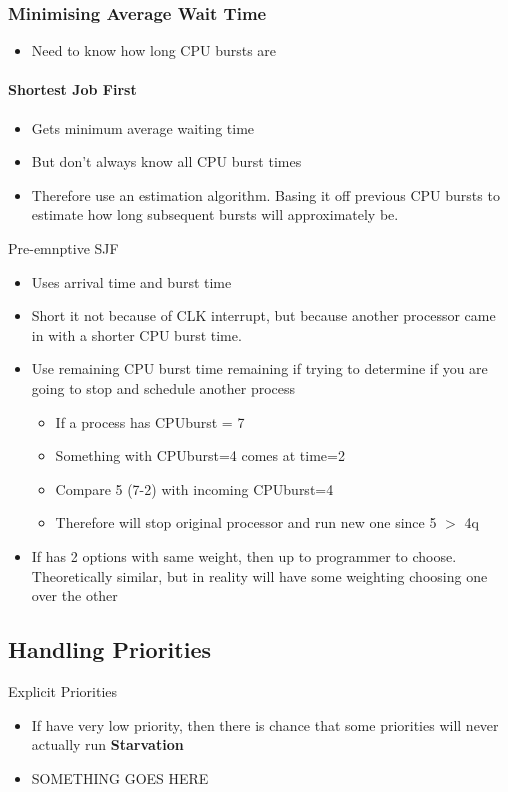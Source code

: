 \documentclass{article}
\begin{document}
		\subsubsection{Minimising Average Wait Time}
			\begin{itemize}
				\item Need to know how long CPU bursts are
			\end{itemize}

			\paragraph{Shortest Job First}
			\begin{itemize}
				\item Gets minimum average waiting time
				\item But don't always know all CPU burst times
				\item Therefore use an estimation algorithm. Basing it off previous CPU bursts to estimate how long subsequent bursts will approximately be.
			\end{itemize}

			Pre-emnptive SJF
			\begin{itemize}
				\item Uses arrival time and burst time
				\item Short it not because of CLK interrupt, but because another processor came in with a shorter CPU burst time.
				\item Use remaining CPU burst time remaining if trying to determine if you are going to stop and schedule another process
				\begin{itemize}
					\item If a process has CPUburst = 7 
					\item Something with CPUburst=4 comes at time=2
					\item Compare 5 (7-2) with incoming CPUburst=4
					\item Therefore will stop original processor and run new one since 5 $>$ 4q
				\end{itemize}
				\item If has 2 options with same weight, then up to programmer to choose. Theoretically similar, but in reality will have some weighting choosing one over the other
			\end{itemize}

	\subsection{Handling Priorities}
		Explicit Priorities
		\begin{itemize}
			\item If have very low priority, then there is chance that some priorities will never actually run \textbf{Starvation}
			\item SOMETHING GOES HERE
		\end{itemize}
\end{document}
